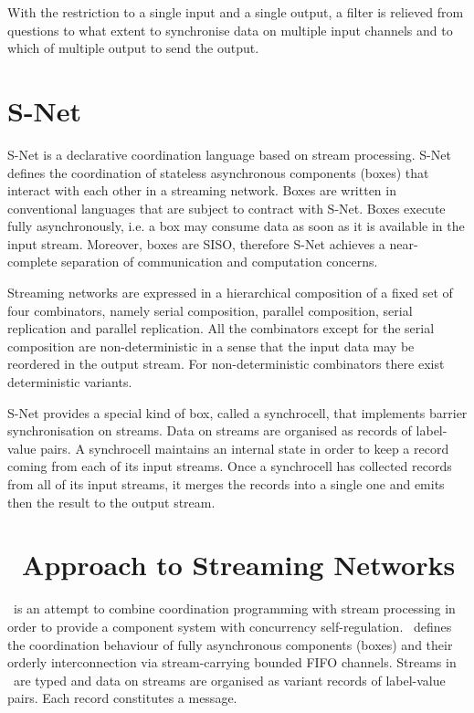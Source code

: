 With the restriction to a single input and a single output, a filter is relieved from questions to what extent to synchronise data on multiple input channels and to which of multiple output to send the output.


    \section{S-Net}
S-Net \cite{snet_intro} is a declarative coordination language based on stream processing. S-Net defines the coordination of stateless asynchronous components (boxes) that interact with each other in a streaming network. Boxes are written in conventional languages that are subject to contract with S-Net. Boxes execute fully asynchronously, i.e. a box may consume data as soon as it is available in the input stream. Moreover, boxes are SISO, therefore S-Net achieves a near-complete separation of communication and computation concerns.

Streaming networks are expressed in a hierarchical composition of a fixed set of four combinators, namely serial composition, parallel composition, serial replication and parallel replication. All the combinators except for the serial composition are non-deterministic in a sense that the input data may be reordered in the output stream. For non-deterministic combinators there exist deterministic variants.

S-Net provides a special kind of box, called a synchrocell, that implements barrier synchronisation on streams. Data on streams are organised as records of label-value pairs. A synchrocell maintains an internal state in order to keep a record coming from each of its input streams. Once a synchrocell has collected records from all of its input streams, it merges the records into a single one and emits then the result to the output stream.


    \section{\ak\ Approach to Streaming Networks}
\ak\ is an attempt to combine coordination programming with stream processing in order to provide a component system with concurrency self-regulation. \ak\ defines the coordination behaviour of fully asynchronous components (boxes) and their orderly interconnection via stream-carrying bounded FIFO channels. Streams in \ak\ are typed and data on streams are organised as variant records of label-value pairs. Each record constitutes a message.

